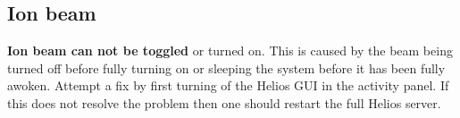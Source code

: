\documentclass[a4paper]{scrartcl}
\begin{document}
\subsection*{Ion beam}
\textbf{Ion beam can not be toggled} or turned on. This is caused by the beam being turned off before fully turning on or sleeping the system before it has been fully awoken. Attempt a fix by first turning of the Helios GUI in the activity panel. If this does not resolve the problem then one should restart the full Helios server.
\end{document}
